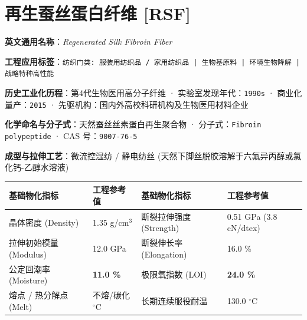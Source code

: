 \documentclass[11pt,openright,twoside,UTF8]{ctexbook}
\begin{document}
\section{再生蚕丝蛋白纤维 [RSF]}
\label{sec:rsf}

\noindent\textbf{英文通用名称}：\textit{Regenerated Silk Fibroin Fiber}\par
\noindent\textbf{工程应用标签}：\texttt{纺织门类: 服装用纺织品 / 家用纺织品 | 生物基原料 | 环境生物降解 | 战略特种高性能}\par
\noindent\textbf{历史工业化历程}：第4代生物医用高分子纤维 · 实验室发现年代：\texttt{1990s} · 商业化量产：\texttt{2015} · 先驱机构：国内外高校科研机构及生物医用材料企业\par
\noindent\textbf{化学命名与分子式}：天然蚕丝丝素蛋白再生聚合物 · 分子式：\texttt{Fibroin polypeptide} · CAS 号：\texttt{9007-76-5}\par
\noindent\textbf{成型与拉伸工艺}：微流控湿纺 / 静电纺丝 (天然下脚丝脱胶溶解于六氟异丙醇或氯化钙-乙醇水溶液)\par

\vspace{0.15cm}
\begin{center}
\small
\begin{tabularx}{\textwidth}{p{3.8cm}Xp{3.8cm}X}
\toprule
\textbf{基础物化指标} & \textbf{工程参考值} & \textbf{基础物化指标} & \textbf{工程参考值} \\
\midrule
晶体密度 (Density) & 1.35 g/cm$^3$ & 断裂拉伸强度 (Strength) & 0.51 GPa (3.8 cN/dtex) \\
拉伸初始模量 (Modulus) & 12.0 GPa & 断裂伸长率 (Elongation) & 16.0 \% \\
公定回潮率 (Moisture) & \textbf{11.0 \%} & 极限氧指数 (LOI) & \textbf{24.0 \%} \\
熔点 / 热分解点 (Melt) & 不熔/碳化 $^\circ\mathrm{C}$ & 长期连续服役耐温 & 130.0 $^\circ\mathrm{C}$ \\
\bottomrule
\end{tabularx}
\end{center}
\vspace{0.15cm}
\end{document}
